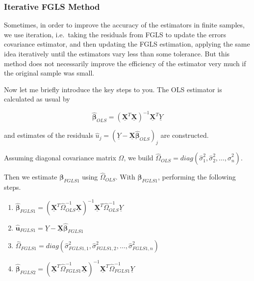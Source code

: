 \documentclass[
  12pt,
]{article}
\providecommand{\tightlist}{%
  \setlength{\itemsep}{0pt}\setlength{\parskip}{0pt}}
\begin{document}
\hypertarget{iterative-fgls-method}{%
\subsubsection{Iterative FGLS Method}\label{iterative-fgls-method}}

Sometimes, in order to improve the accuracy of the estimators in finite samples, we use iteration, i.e.~taking the residuals from FGLS to update the errors covariance estimator, and then updating the FGLS estimation, applying the same idea iteratively until the estimators vary less than some tolerance. But this method does not necessarily improve the efficiency of the estimator very much if the original sample was small.

Now let me briefly introduce the key steps to you. The OLS estimator is calculated as usual by

\[
\hat{\mathbf{\beta}}_{OLS} = \left(\underline{\mathbf{X}}^{T} \underline{\mathbf{X}} \right)^{-1} \underline{\mathbf{X}}^{T} \underline{Y}
\]

and estimates of the residuals \(\hat{u}_j = (\underline{Y} - \underline{\mathbf{X}} \hat{\mathbf{\beta}}_{OLS})_j\) are constructed.

Assuming diagonal covariance matrix \(\Omega\),
we build \(\hat{\Omega}_{OLS} = diag(\hat{\sigma}^2_1, \hat{\sigma}^2_2, \ldots, \hat{\sigma}^2_n)\).

Then we estimate
\(\mathbf{\beta}_{FGLS1}\) using \(\hat{\Omega}_{OLS}\). With \(\mathbf{\beta}_{FGLS1}\), performing the following steps.

\begin{enumerate}
\def\labelenumi{\arabic{enumi}.}
\tightlist
\item
  \(\hat{\mathbf{\beta}}_{FGLS1} = \left(\underline{\mathbf{X}}^{T} \hat{\Omega}^{-1}_{OLS} \underline{\mathbf{X}} \right)^{-1} \underline{\mathbf{X}}^{T} \hat{\Omega}^{-1}_{OLS} \underline{Y}\)
\item
  \(\hat{\mathbf{u}}_{FGLS1} = \underline{Y} - \underline{\mathbf{X}}\hat{\mathbf{\beta}}_{FGLS1}\) \label{step2}
\item
  \(\hat{\Omega}_{FGLS1} = diag(\hat{\sigma}^2_{FGLS1,1}, \hat{\sigma}^2_{FGLS1,2}, \dots, \hat{\sigma}^2_{FGLS1,n} )\)
\item
  \(\hat{\mathbf{\beta}}_{FGLS2} = \left(\underline{\mathbf{X}}^{T} \hat{\Omega}^{-1}_{FGLS1} \underline{\mathbf{X}} \right)^{-1} \underline{\mathbf{X}}^{T} \hat{\Omega}^{-1}_{FGLS1} \underline{Y}\)
\end{enumerate}
\end{document}
